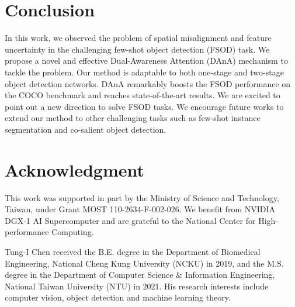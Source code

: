 \documentclass[journal]{IEEEtran}
\begin{document}
\section{Conclusion}
In this work, we observed the problem of spatial misalignment and feature uncertainty in the challenging few-shot object detection (FSOD) task. We propose a novel and effective Dual-Awareness Attention (DAnA) mechanism to tackle the problem. Our method is adaptable to both one-stage and two-stage object detection networks. DAnA remarkably boosts the FSOD performance on the COCO benchmark and reaches state-of-the-art results. We are excited to point out a new direction to solve FSOD tasks. We encourage future works to extend our method to other challenging tasks such as few-shot instance segmentation and co-salient object detection.













\section*{Acknowledgment}
This work was supported in part by the Ministry of Science and Technology, Taiwan, under Grant MOST 110-2634-F-002-026. We benefit from NVIDIA DGX-1 AI Supercomputer and are grateful to the National Center for High-performance Computing.








































\begin{IEEEbiography}
    {Tung-I Chen}
received the B.E. degree in the Department of Biomedical Engineering, National Cheng Kung University (NCKU) in 2019, and the M.S. degree in the Department of Computer Science \& Information Engineering, National Taiwan University (NTU) in 2021. His research interests include computer vision, object detection and machine learning theory.
\end{IEEEbiography}
\end{document}
